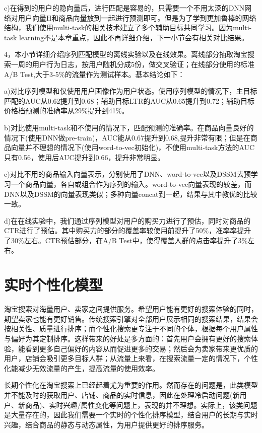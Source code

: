 c)在得到的用户的隐向量后，进行匹配是容易的，只需要一个不用太深的DNN网络对用户向量H和商品向量放到一起进行预测即可。但是为了学到更加鲁棒的网络结构，我们使用multi-task的相关技术\cite{16}建立了多个辅助目标共同学习。因为multi-task learning不是本章重点，因此不再详细介绍，下一小节会有相关对比结果。

4，本小节详细介绍序列匹配模型的离线实验以及在线效果。离线部分抽取淘宝搜索一周的用户行为日志，按用户随机分成5份，做交叉验证；在线部分使用的标准A/B Test,大于3-5\%的流量作为测试样本。基本结论如下：

a)对比序列模型和仅使用用户画像作为用户状态。使用序列模型的情况下，主目标匹配的AUC从0.62提升到0.68；辅助目标LTR的AUC从0.65提升到0.72；辅助目标价格档预测的准确率从29\%提升到41\%。

b)对比使用multi-task和不使用的情况下，匹配预测的准确率。在商品向量良好的情况下(使用DNN做pre-train)，AUC能从0.67提升到0.68,提升非常有限；但是在商品向量并不理想的情况下(使用word-to-vec初始化)，不使用multi-task方法的AUC只有0.56，使用后AUC提升到0.66，提升非常明显。

c)对比不用的商品输入向量表示，分别使用了DNN、word-to-vec以及DSSM去预学习一个商品向量，各自或组合作为序列的输入。word-to-vec向量表现的较差，而DNN以及DSSM的向量表现类似；多种向量concat到一起，结果与其中教优的比较一致。

d)在在线实验中，我们通过序列模型对用户的购买力进行了预估，同时对商品的CTR进行了预估。其中购买力的部分的覆盖率较使用前提升了50\%，准率率提升了30\%左右。CTR预估部分，在A/B Test中，使得覆盖人群的点击率提升了3\%左右。

\section{实时个性化模型}
   淘宝搜索对海量用户、卖家之间提供服务。希望用户能有更好的搜索体验的同时，期望卖家也能有更好销售。传统搜索引擎对全部用户展示相同的搜索结果，结果会按相关性、质量进行排序；而个性化搜索更专注于不同的个体，根据每个用户属性与偏好为其定制排序。这样带来的好处是多方面的：首先用户会拥有更好的搜索体验，能看到更多自己偏好的内容从而促进更多的交易；然后会为卖家带来更优质的用户，店铺会吸引更多目标人群；从流量上来看，在搜索流量一定的情况下，个性化能减少无效流量的产生，提高流量的使用效率。
   
  长期个性化在淘宝搜索上已经起着尤为重要的作用。然而存在的问题是，此类模型并不能及时的获取用户、店铺、商品的实时信息，因此在处理冷启动问题(新用户、新商品)、实时兴趣/属性变化等问题上，表现的并不理想。实际上，该类问题是大量存在的，因此我们需要一个实时的个性化排序模型，结合用户的长期与实时兴趣，结合商品的静态与动态属性，为用户提供更好的排序服务。
  
